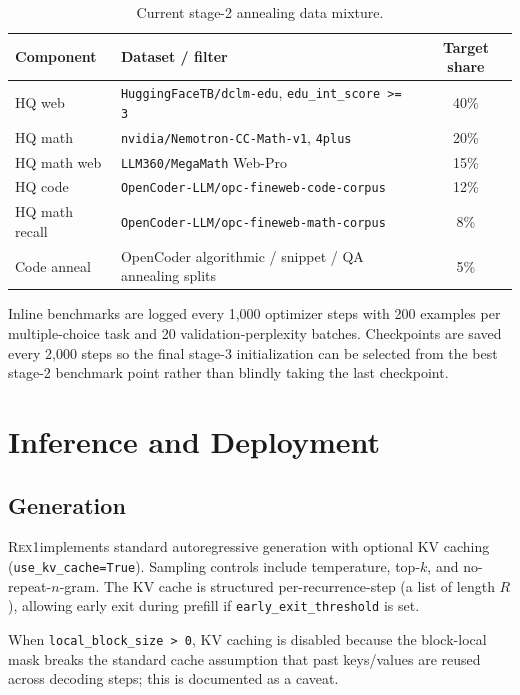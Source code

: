 \documentclass[11pt,a4paper]{article}
\newcommand{\REX}{\textsc{Rex1}\xspace}
\providecommand{\xspace}{}
\begin{document}
\begin{table}[h]
  \centering
  \caption{Current stage-2 annealing data mixture.}
  \label{tab:stage2-data}
  \footnotesize
  \begin{tabular}{llc}
    \toprule
    Component & Dataset / filter & Target share \\
    \midrule
    HQ web & \texttt{HuggingFaceTB/dclm-edu}, \texttt{edu\_int\_score >= 3} & 40\% \\
    HQ math & \texttt{nvidia/Nemotron-CC-Math-v1}, \texttt{4plus} & 20\% \\
    HQ math web & \texttt{LLM360/MegaMath} Web-Pro & 15\% \\
    HQ code & \texttt{OpenCoder-LLM/opc-fineweb-code-corpus} & 12\% \\
    HQ math recall & \texttt{OpenCoder-LLM/opc-fineweb-math-corpus} & 8\% \\
    Code anneal & OpenCoder algorithmic / snippet / QA annealing splits & 5\% \\
    \bottomrule
  \end{tabular}
\end{table}

Inline benchmarks are logged every 1{,}000 optimizer steps with 200 examples per
multiple-choice task and 20 validation-perplexity batches. Checkpoints are saved
every 2{,}000 steps so the final stage-3 initialization can be selected from the
best stage-2 benchmark point rather than blindly taking the last checkpoint.

\section{Inference and Deployment}

\subsection{Generation}

\REX implements standard autoregressive generation with optional KV caching
(\texttt{use\_kv\_cache=True}). Sampling controls include temperature, top-$k$,
and no-repeat-$n$-gram. The KV cache is structured per-recurrence-step (a
list of length $R$), allowing early exit during prefill if
\texttt{early\_exit\_threshold} is set.

When \texttt{local\_block\_size > 0}, KV caching is disabled because the
block-local mask breaks the standard cache assumption that past keys/values
are reused across decoding steps; this is documented as a caveat.
\end{document}
